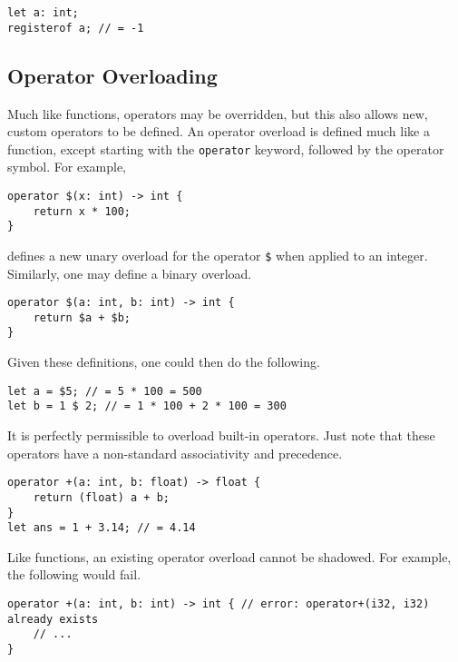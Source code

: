 \begin{lstlisting}[language=CustomLang]
let a: int;
registerof a; // = -1
\end{lstlisting}

\subsection{Operator Overloading}

Much like functions, operators may be overridden, but this also allows new, custom operators to be defined.
An operator overload is defined much like a function, except starting with the \texttt{operator} keyword, followed by the operator symbol.
For example,

\begin{lstlisting}[language=CustomLang]
operator $(x: int) -> int {
    return x * 100;
}
\end{lstlisting}

defines a new unary overload for the operator \texttt{\$} when applied to an integer.
Similarly, one may define a binary overload.

\begin{lstlisting}[language=CustomLang]
operator $(a: int, b: int) -> int {
    return $a + $b;
}
\end{lstlisting}

Given these definitions, one could then do the following.

\begin{lstlisting}[language=CustomLang]
let a = $5; // = 5 * 100 = 500
let b = 1 $ 2; // = 1 * 100 + 2 * 100 = 300
\end{lstlisting}

It is perfectly permissible to overload built-in operators.
Just note that these operators have a non-standard associativity and precedence.

\begin{lstlisting}[language=CustomLang]
operator +(a: int, b: float) -> float {
    return (float) a + b;
}
let ans = 1 + 3.14; // = 4.14
\end{lstlisting}

Like functions, an existing operator overload cannot be shadowed.
For example, the following would fail.

\begin{lstlisting}[language=CustomLang]
operator +(a: int, b: int) -> int { // error: operator+(i32, i32) already exists
    // ...
}
\end{lstlisting}
